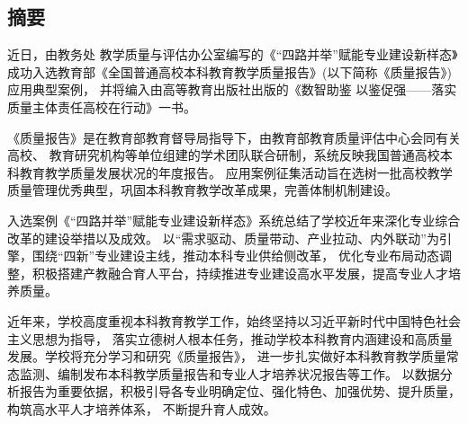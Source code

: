 \begin{ujnabstract}
\section[摘要]{摘\qquad 要}
近日，由教务处 教学质量与评估办公室编写的《“四路并举”赋能专业建设新样态》成功入选教育部《全国普通高校本科教育教学质量报告》(以下简称《质量报告》)应用典型案例，
并将编入由高等教育出版社出版的《数智助鉴 以鉴促强——落实质量主体责任高校在行动》一书。

《质量报告》是在教育部教育督导局指导下，由教育部教育质量评估中心会同有关高校、
教育研究机构等单位组建的学术团队联合研制，系统反映我国普通高校本科教育教学质量发展状况的年度报告。
应用案例征集活动旨在选树一批高校教学质量管理优秀典型，巩固本科教育教学改革成果，完善体制机制建设。

入选案例《“四路并举”赋能专业建设新样态》系统总结了学校近年来深化专业综合改革的建设举措以及成效。
以“需求驱动、质量带动、产业拉动、内外联动”为引擎，围绕“四新”专业建设主线，推动本科专业供给侧改革，
优化专业布局动态调整，积极搭建产教融合育人平台，持续推进专业建设高水平发展，提高专业人才培养质量。

近年来，学校高度重视本科教育教学工作，始终坚持以习近平新时代中国特色社会主义思想为指导，
落实立德树人根本任务，推动学校本科教育内涵建设和高质量发展。学校将充分学习和研究《质量报告》，
进一步扎实做好本科教育教学质量常态监测、编制发布本科教学质量报告和专业人才培养状况报告等工作。
以数据分析报告为重要依据，积极引导各专业明确定位、强化特色、加强优势、提升质量，构筑高水平人才培养体系，
不断提升育人成效。
\small{}
\end{ujnabstract}
